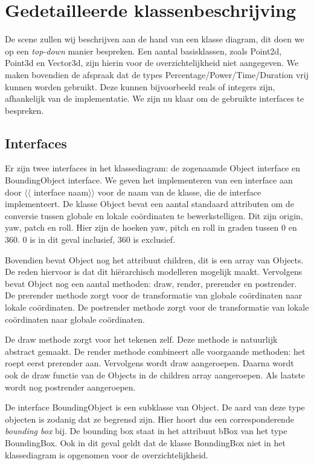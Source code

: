 \documentclass[a4paper,11pt]{article}
\begin{document}
	
\section{Gedetailleerde klassenbeschrijving}

    De scene zullen wij beschrijven aan de hand van een klasse diagram, dit doen we op een \emph{top-down} manier bespreken. Een aantal basisklassen, zoals Point2d, Point3d en Vector3d,  zijn hierin voor de overzichtelijkheid niet aangegeven. We maken bovendien de afspraak dat de types Percentage/Power/Time/Duration vrij kunnen worden gebruikt. Deze kunnen bijvoorbeeld reals of integers zijn, afhankelijk van de implementatie.  We zijn nu klaar om de gebruikte interfaces te bespreken.

\subsection{Interfaces}
Er zijn twee interfaces in het klassediagram: de zogenaamde Object interface en BoundingObject interface. We geven het implementeren van een interface aan door $\langle\langle$ interface naam$\rangle \rangle$ voor de naam van de klasse, die de interface implementeert.  De klasse Object bevat een aantal standaard attributen om de conversie tussen globale en lokale co\"ordinaten te bewerkstelligen. Dit zijn origin, yaw, patch en roll. Hier zijn de hoeken yaw, pitch en roll in graden tussen 0 en 360. 0 is in dit geval inclusief, 360 is exclusief. 

Bovendien bevat Object nog het attribuut children, dit is een array van Objects. De reden hiervoor is dat dit hi\"erarchisch modelleren mogelijk maakt. Vervolgens bevat Object nog een aantal methoden: draw, render, prerender en postrender. De prerender methode zorgt voor de transformatie van globale co\"ordinaten naar lokale co\"ordinaten. De postrender methode zorgt voor de transformatie van lokale co\"ordinaten naar globale co\"ordinaten. 

De draw methode zorgt voor het tekenen zelf. Deze methode is natuurlijk abstract gemaakt. De render methode combineert alle voorgaande methoden: het roept eerst prerender aan. Vervolgens wordt draw aangeroepen. Daarna wordt ook de draw functie van de Objects in de children array aangeroepen. Als laatste wordt nog postrender aangeroepen.

De interface BoundingObject is een subklasse van Object. De aard van deze type objecten is zodanig dat ze begrensd zijn. Hier hoort dus een corresponderende \emph{bounding box} bij. De bounding box staat in het attribuut bBox van het type BoundingBox. Ook in dit geval geldt dat de klasse BoundingBox niet in het klassediagram is opgenomen voor de overzichtelijkheid. 
\end{document}
